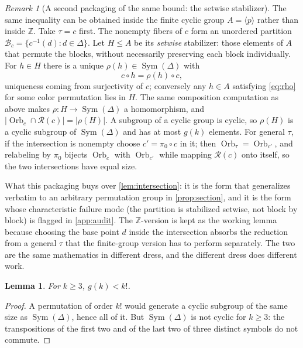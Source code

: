 \documentclass[11pt,a4paper]{article}
\numberwithin{equation}{section}
\newtheorem{lemma}[theorem]{Lemma}
\theoremstyle{definition}
\theoremstyle{remark}
\newtheorem{remark}[theorem]{Remark}
\newcommand{\Z}{\mathbb Z}
\newcommand{\D}{\Delta}
\newcommand{\Sym}{\operatorname{Sym}}
\newcommand{\Orb}{\operatorname{Orb}}
\begin{document}
\begin{remark}[A second packaging of the same bound: the setwise
stabilizer]\label{rem:setwise}
The same inequality can be obtained inside the finite cyclic group
$A=\langle p\rangle$ rather than inside $\Z$. Take $\tau=c$ first. The
nonempty fibers of $c$ form an unordered partition
$\mathcal B_c=\{c^{-1}(d):d\in\D\}$. Let $H\le A$ be its \emph{setwise}
stabilizer: those elements of $A$ that permute the blocks, without
necessarily preserving each block individually. For $h\in H$ there is a
unique $\rho(h)\in\Sym(\D)$ with
\begin{equation}\label{eq:rho}
 c\circ h=\rho(h)\circ c,
\end{equation}
uniqueness coming from surjectivity of $c$; conversely any $h\in A$
satisfying \eqref{eq:rho} for some color permutation lies in $H$. The same
composition computation as above makes $\rho:H\to\Sym(\D)$ a homomorphism,
and $|\Orb_c\cap\mathcal R(c)|=|\rho(H)|$. A subgroup of a cyclic group is
cyclic, so $\rho(H)$ is a cyclic subgroup of $\Sym(\D)$ and has at most
$g(k)$ elements. For general $\tau$, if the intersection is nonempty choose
$c'=\pi_0\circ c$ in it; then $\Orb_\tau=\Orb_{c'}$, and relabeling by
$\pi_0$ bijects $\Orb_c$ with $\Orb_{c'}$ while mapping $\mathcal R(c)$ onto
itself, so the two intersections have equal size.

What this packaging buys over \cref{lem:intersection}: it is the form that
generalizes verbatim to an arbitrary permutation group in
\cref{prop:section}, and it is the form whose characteristic failure mode
(the partition is stabilized setwise, not block by block) is flagged in
\cref{app:audit}. The $\Z$-version is kept as the working lemma because
choosing the base point $d$ inside the intersection absorbs the reduction
from a general $\tau$ that the finite-group version has to perform
separately. The two are the same mathematics in different dress, and the
different dress does different work.
\end{remark}

\begin{lemma}\label{lem:strict}
For $k\ge3$, $g(k)<k!$.
\end{lemma}
\begin{proof}
A permutation of order $k!$ would generate a cyclic subgroup of the same
size as $\Sym(\D)$, hence all of it. But $\Sym(\D)$ is not cyclic for
$k\ge3$: the transpositions of the first two and of the last two of three
distinct symbols do not commute.
\end{proof}
\end{document}
